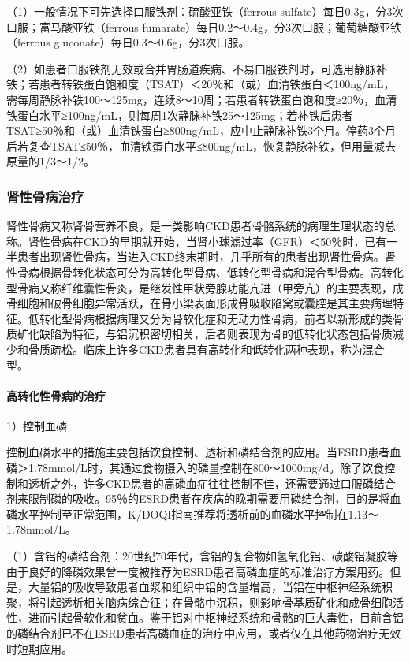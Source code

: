 （1）一般情况下可先选择口服铁剂：硫酸亚铁（ferrous
sulfate）每日0.3g，分3次口服；富马酸亚铁（ferrous
fumarate）每日0.2～0.4g，分3次口服；葡萄糖酸亚铁（ferrous
gluconate）每日0.3～0.6g，分3次口服。

（2）如患者口服铁剂无效或合并胃肠道疾病、不易口服铁剂时，可选用静脉补铁；若患者转铁蛋白饱和度（TSAT）＜20％和（或）血清铁蛋白＜100ng/mL，需每周静脉补铁100～125mg，连续8～10周；若患者转铁蛋白饱和度≥20％，血清铁蛋白水平≥100ng/mL，则每周1次静脉补铁25～125mg；若补铁后患者TSAT≥50％和（或）血清铁蛋白≥800ng/mL，应中止静脉补铁3个月。停药3个月后若复查TSAT≤50％，血清铁蛋白水平≤800ng/mL，恢复静脉补铁，但用量减去原量的1/3～1/2。

\subsubsection{肾性骨病治疗}

肾性骨病又称肾骨营养不良，是一类影响CKD患者骨骼系统的病理生理状态的总称。肾性骨病在CKD的早期就开始，当肾小球滤过率（GFR）＜50％时，已有一半患者出现肾性骨病，当进入CKD终末期时，几乎所有的患者出现肾性骨病。肾性骨病根据骨转化状态可分为高转化型骨病、低转化型骨病和混合型骨病。高转化型骨病又称纤维囊性骨炎，是继发性甲状旁腺功能亢进（甲旁亢）的主要表现，成骨细胞和破骨细胞异常活跃，在骨小梁表面形成骨吸收陷窝或囊腔是其主要病理特征。低转化型骨病根据病理又分为骨软化症和无动力性骨病，前者以新形成的类骨质矿化缺陷为特征，与铝沉积密切相关，后者则表现为骨的低转化状态包括骨质减少和骨质疏松。临床上许多CKD患者具有高转化和低转化两种表现，称为混合型。
\paragraph{高转化性骨病的治疗}

1）控制血磷

控制血磷水平的措施主要包括饮食控制、透析和磷结合剂的应用。当ESRD患者血磷＞1.78mmol/L时，其通过食物摄入的磷量控制在800～1000mg/d。除了饮食控制和透析之外，许多CKD患者的高磷血症往往控制不佳，还需要通过口服磷结合剂来限制磷的吸收。95％的ESRD患者在疾病的晚期需要用磷结合剂，目的是将血磷水平控制至正常范围，K/DOQI指南推荐将透析前的血磷水平控制在1.13～1.78mmol/L。

（1）含铝的磷结合剂：20世纪70年代，含铝的复合物如氢氧化铝、碳酸铝凝胶等由于良好的降磷效果曾一度被推荐为ESRD患者高磷血症的标准治疗方案用药。但是，大量铝的吸收导致患者血浆和组织中铝的含量增高，当铝在中枢神经系统积聚，将引起透析相关脑病综合征；在骨骼中沉积，则影响骨基质矿化和成骨细胞活性，进而引起骨软化和贫血。鉴于铝对中枢神经系统和骨骼的巨大毒性，目前含铝的磷结合剂已不在ESRD患者高磷血症的治疗中应用，或者仅在其他药物治疗无效时短期应用。

